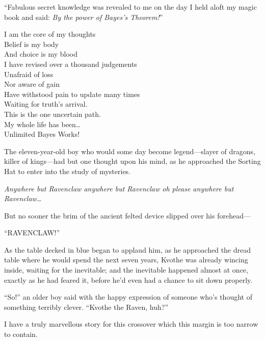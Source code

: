 “Fabulous secret knowledge was revealed to me on the day I held aloft my magic book and said: \emph{By the power of Bayes’s Theorem!}”


\begin{emph}
I am the core of my thoughts\\
Belief is my body\\
And choice is my blood\\
I have revised over a thousand judgements\\
Unafraid of loss\\
Nor aware of gain\\
Have withstood pain to update many times\\
Waiting for truth’s arrival.\\
This is the one uncertain path.\\
My whole life has been…\\
Unlimited Bayes Works!
\end{emph}


The eleven-year-old boy who would some day become legend—slayer of dragons, killer of kings—had but one thought upon his mind, as he approached the Sorting Hat to enter into the study of mysteries.

\emph{Anywhere but Ravenclaw anywhere but Ravenclaw oh please anywhere but Ravenclaw…}

But no sooner the brim of the ancient felted device slipped over his forehead—

“RAVENCLAW!”

As the table decked in blue began to applaud him, as he approached the dread table where he would spend the next seven years, Kvothe was already wincing inside, waiting for the inevitable; and the inevitable happened almost at once, exactly as he had feared it, before he’d even had a chance to sit down properly.

“So!” an older boy said with the happy expression of someone who’s thought of something terribly clever. “Kvothe the Raven, huh?”


I have a truly marvellous story for this crossover which this margin is too narrow to contain.


